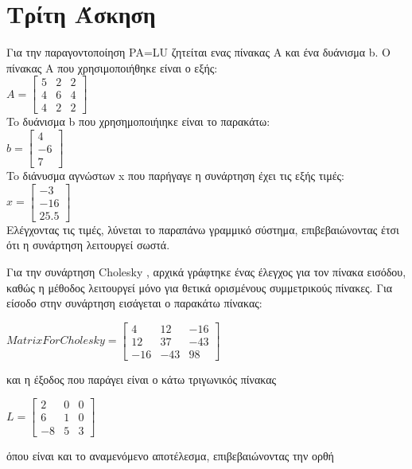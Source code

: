 \documentclass[a4paper,11pt]{article}
\newcommand{\lt}{\latintext}
\newcommand{\gt}{\greektext}
\begin{document}
\section{Τρίτη Άσκηση}
Για την παραγοντοποίηση \lt PA=LU \gt ζητείται ενας πίνακας Α και ένα δυάνισμα \lt 
b\gt. Ο πίνακας Α που χρησιμοποιήθηκε είναι ο εξής: \\
$Α=\begin{bmatrix}
5 & 2 & 2\\
4 & 6 & 4\\
4 & 2 & 2
\end{bmatrix}$ \\
To δυάνισμα \lt b \gt που χρησημοποιήιηκε είναι το παρακάτω: \\
$b=\begin{bmatrix}
4 \\
-6 \\
7 
\end{bmatrix}$ \\
To διάνυσμα αγνώστων \lt x \gt που παρήγαγε η συνάρτηση έχει τις εξής τιμές:
$x=\begin{bmatrix}
-3 \\
-16 \\
25.5
\end{bmatrix}$ \\
Ελέγχοντας τις τιμές, λύνεται το παραπάνω γραμμικό σύστημα, επιβεβαιώνοντας
έτσι ότι η συνάρτηση λειτουργεί σωστά.
\par
Για την συνάρτηση \lt Cholesky \gt, αρχικά γράφτηκε ένας έλεγχος για τον 
πίνακα εισόδου, καθώς η μέθοδος λειτουργεί μόνο για θετικά ορισμένους συμμετρικούς πίνακες.
\newpage Για είσοδο στην συνάρτηση εισάγεται ο παρακάτω πίνακας:\\
\begin{center}
$MatrixForCholesky=\begin{bmatrix}
4 & 12 & -16\\
12 & 37 & -43\\
-16 & -43 & 98
\end{bmatrix}$ \\
\end{center}
και η έξοδος που παράγει είναι ο κάτω τριγωνικός πίνακας \\
\begin{center}
$L=\begin{bmatrix}
2 & 0 & 0\\
6 & 1 & 0\\
-8 & 5 & 3
\end{bmatrix}$
\end{center}
όπου είναι και το αναμενόμενο αποτέλεσμα, επιβεβαιώνοντας την ορθή 
\end{document}
